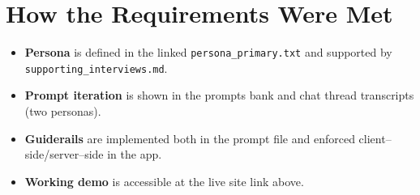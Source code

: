 \documentclass[11pt]{article}
\begin{document}
\section*{How the Requirements Were Met}
\begin{itemize}[leftmargin=1.2em]
  \item \textbf{Persona} is defined in the linked \texttt{persona\_primary.txt} and supported by \texttt{supporting\_interviews.md}.
  \item \textbf{Prompt iteration} is shown in the prompts bank and chat thread transcripts (two personas).
  \item \textbf{Guiderails} are implemented both in the prompt file and enforced client--side/server--side in the app.
  \item \textbf{Working demo} is accessible at the live site link above.
\end{itemize}
\end{document}
